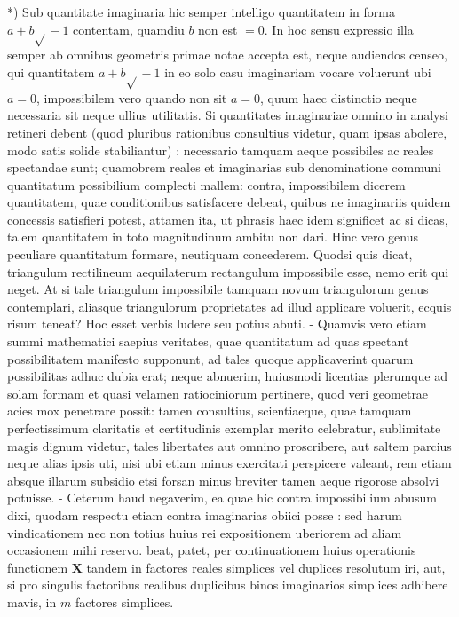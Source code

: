 \documentclass[twoside,12pt, showframe]{memoir}
\begin{document}
*) Sub quantitate imaginaria hic semper intelligo quantitatem in forma \(a+b \sqrt{ }-1\) contentam, quamdiu \(b\) non est \(=0\). In hoc sensu expressio illa semper ab omnibus geometris primae notae accepta est, neque audiendos censeo, qui quantitatem \(a+b \sqrt{ }-1\) in eo solo casu imaginariam vocare voluerunt ubi \(a=0\), impossibilem vero quando non sit \(a=0\), quum haec distinctio neque necessaria sit neque ullius utilitatis. Si quantitates imaginariae omnino in analysi retineri debent (quod pluribus rationibus consultius videtur, quam ipsas abolere, modo satis solide stabiliantur) : necessario tamquam aeque possibiles ac reales spectandae sunt; quamobrem reales et imaginarias sub denominatione communi quantitatum possibilium complecti mallem: contra, impossibilem dicerem quantitatem, quae conditionibus satisfacere debeat, quibus ne imaginariis quidem concessis satisfieri potest, attamen ita, ut phrasis haec idem significet ac si dicas, talem quantitatem in toto magnitudinum ambitu non dari. Hinc vero genus peculiare quantitatum formare, neutiquam concederem. Quodsi quis dicat, triangulum rectilineum aequilaterum rectangulum impossibile esse, nemo erit qui neget. At si tale triangulum impossibile tamquam novum triangulorum genus contemplari, aliasque triangulorum proprietates ad illud applicare voluerit, ecquis risum teneat? Hoc esset verbis ludere seu potius abuti. - Quamvis vero etiam summi mathematici saepius veritates, quae quantitatum ad quas spectant possibilitatem manifesto supponunt, ad tales quoque applicaverint quarum possibilitas adhuc dubia erat; neque abnuerim, huiusmodi licentias plerumque ad solam formam et quasi velamen ratiociniorum pertinere, quod veri geometrae acies mox penetrare possit: tamen consultius, scientiaeque, quae tamquam perfectissimum claritatis et certitudinis exemplar merito celebratur, sublimitate magis dignum videtur, tales libertates aut omnino proscribere, aut saltem parcius neque alias ipsis uti, nisi ubi etiam minus exercitati perspicere valeant, rem etiam absque illarum subsidio etsi forsan minus breviter tamen aeque rigorose absolvi potuisse. - Ceterum haud negaverim, ea quae hic contra impossibilium abusum dixi, quodam respectu etiam contra imaginarias obiici posse : sed harum vindicationem nec non totius huius rei expositionem uberiorem ad aliam occasionem mihi reservo.
beat, patet, per continuationem huius operationis functionem \(\boldsymbol{X}\) tandem in factores reales simplices vel duplices resolutum iri, aut, si pro singulis factoribus realibus duplicibus binos imaginarios simplices adhibere mavis, in \(m\) factores simplices.
\end{document}
